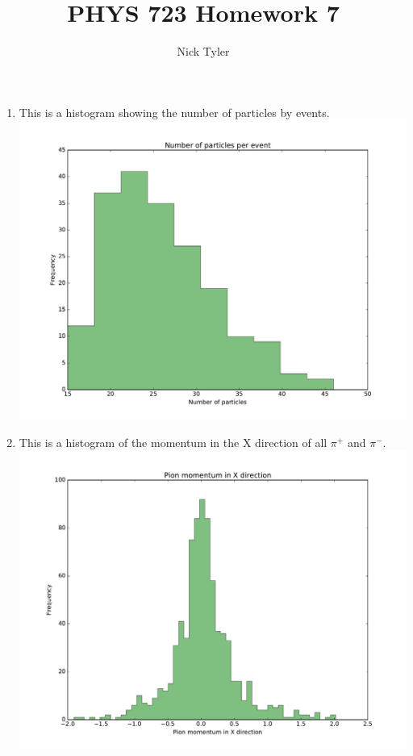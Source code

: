 \documentclass[pdftex]{article}
\title{PHYS 723 Homework 7}
\author{Nick Tyler}
\date{}
\begin{document}
\captionsetup[figure]{aboveskip=-15pt}
\captionsetup[figure]{belowskip=15pt}
\maketitle
\begin{enumerate}
	\item  This is a histogram showing the number of particles by events.\\
	\includegraphics[scale=0.4]{Number_of_particles.pdf}\\


	\item This is a histogram of the momentum in the X direction of all $\pi^+$ and $\pi^-$. \\ 
	\includegraphics[scale=0.4]{Pion_px.pdf}\\



\end{enumerate}
\end{document}
